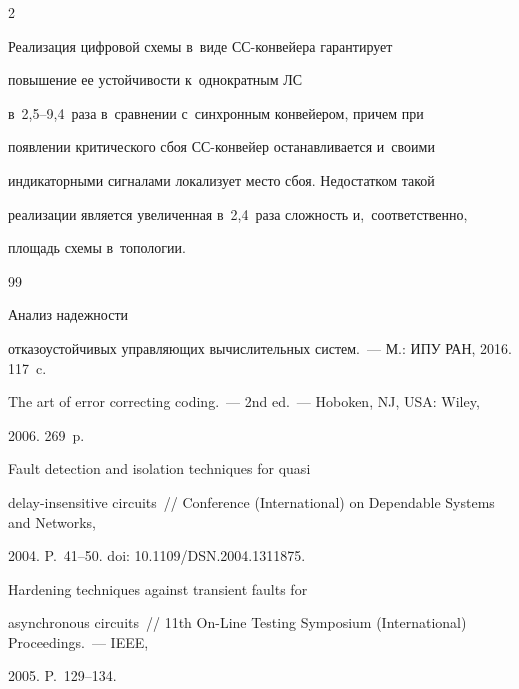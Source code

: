 \begin{multicols}{2}
  

  Реализация цифровой схемы в~виде СС-кон\-вей\-ера гарантирует 

повышение ее устойчивости к~однократным ЛС

в~2,5--9,4~раза в~сравнении с~синхронным конвейером, причем при 

появлении \mbox{критического} сбоя СС-кон\-вей\-ер останавливается и~своими 

индикаторными сигналами локализует место сбоя. Недостатком такой 

реализации является увеличенная в~2,4~раза сложность и,~соответственно, 

площадь схемы в~топологии.



\vspace*{-6pt}

  

{\small\frenchspacing

 {%


 \begin{thebibliography}{99}


  Анализ надежности 

отказоустойчивых управ\-ля\-ющих вы\-чис\-ли\-тель\-ных сис\-тем.~--- М.: ИПУ РАН, 2016. 117~c.


  The art of error correcting coding.~--- 2nd ed.~--- Hoboken, NJ, USA: Wiley, 

2006. 269~p.


  Fault detection and isolation techniques for quasi  

delay-insensitive circuits~// Conference (International) on Dependable Systems and Networks, 

2004. P.~41--50. doi: 10.1109/DSN.2004.1311875.


  Hardening techniques against transient faults for 

asynchronous circuits~// 11th On-Line Testing Symposium (International) Proceedings.~--- IEEE, 

2005. P.~129--134. 


\end{thebibliography}}}
\end{multicols}
